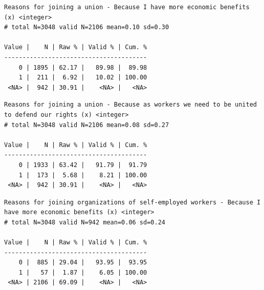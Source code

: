 \documentclass[
  letterpaper,
  DIV=11,
  numbers=noendperiod]{scrreprt}
\newenvironment{Shaded}{\begin{snugshade}}{\end{snugshade}}
\newcommand{\FunctionTok}[1]{\textcolor[rgb]{0.28,0.35,0.67}{#1}}
\newcommand{\NormalTok}[1]{\textcolor[rgb]{0.00,0.23,0.31}{#1}}
\newcommand{\SpecialCharTok}[1]{\textcolor[rgb]{0.37,0.37,0.37}{#1}}
\begin{document}
\begin{verbatim}
Reasons for joining a union - Because I have more economic benefits (x) <integer> 
# total N=3048 valid N=2106 mean=0.10 sd=0.30

Value |    N | Raw % | Valid % | Cum. %
---------------------------------------
    0 | 1895 | 62.17 |   89.98 |  89.98
    1 |  211 |  6.92 |   10.02 | 100.00
 <NA> |  942 | 30.91 |    <NA> |   <NA>
\end{verbatim}

\begin{Shaded}
\end{Shaded}

\begin{verbatim}
Reasons for joining a union - Because as workers we need to be united to defend our rights (x) <integer> 
# total N=3048 valid N=2106 mean=0.08 sd=0.27

Value |    N | Raw % | Valid % | Cum. %
---------------------------------------
    0 | 1933 | 63.42 |   91.79 |  91.79
    1 |  173 |  5.68 |    8.21 | 100.00
 <NA> |  942 | 30.91 |    <NA> |   <NA>
\end{verbatim}

\begin{Shaded}
\end{Shaded}

\begin{verbatim}
Reasons for joining organizations of self-employed workers - Because I have more economic benefits (x) <integer> 
# total N=3048 valid N=942 mean=0.06 sd=0.24

Value |    N | Raw % | Valid % | Cum. %
---------------------------------------
    0 |  885 | 29.04 |   93.95 |  93.95
    1 |   57 |  1.87 |    6.05 | 100.00
 <NA> | 2106 | 69.09 |    <NA> |   <NA>
\end{verbatim}

\begin{Shaded}
\end{Shaded}
\end{document}
